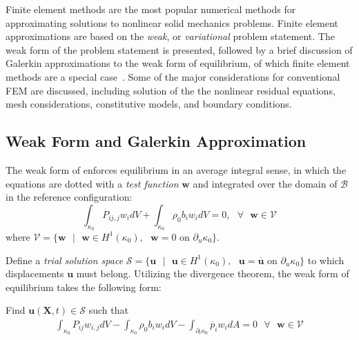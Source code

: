 Finite element methods are the most popular numerical methods for approximating solutions to nonlinear solid mechanics problems. Finite element approximations are based on the \textit{weak}, or \textit{variational} problem statement. The weak form of the problem statement is presented, followed by a brief discussion of Galerkin approximations to the weak form of equilibrium, of which finite element methods are a special case~\cite{rashid_2017}. Some of the major considerations for conventional FEM are discussed, including solution of the the nonlinear residual equations, mesh considerations, constitutive models, and boundary conditions.

\subsection{Weak Form and Galerkin Approximation}

The weak form of  enforces equilibrium in an average integral sense, in which the equations are dotted with a \textit{test function} $\bm{w}$ and integrated over the domain of $\mathcal{B}$ in the reference configuration:
\begin{equation}
\int_{\kappa_0}{P_{ij,j}}w_idV + \int_{\kappa_0}\rho_0b_iw_idV = 0, \text{\ \ } \forall \text{\ \ } \bm{w} \in \mathcal{V}
\end{equation}
where $\mathcal{V} = \lbrace\bm{w} \text{\ }|\text{\ } \bm{w} \in H^1(\kappa_0), \text{\ }\bm{w} = 0 \text{\ \ on\ } \partial_u\kappa_0\rbrace$.

Define a \textit{trial solution space} $\mathcal{S} = \lbrace\bm{u} \text{\ }|\text{\ } \bm{u} \in H^1(\kappa_0), \text{\ }\bm{u} = \overline{\bm{u}} \text{\ \ on\ } \partial_u\kappa_0\rbrace$  to which displacements $\bm{u}$ must belong. Utilizing the divergence theorem, the weak form of equilibrium takes the following form:

Find $\bm{u}(\bm{X},t) \in \mathcal{S}$ such that
\begin{gather}
\int_{\kappa_0}P_{ij}w_{i,j}dV - \int_{\kappa_0}\rho_0b_iw_idV - \int_{\partial_t\kappa_0}\overline{p}_iw_idA = 0 \text{\ \ } \forall \text{\ \ } \bm{w} \in \mathcal{V}
\end{gather}

